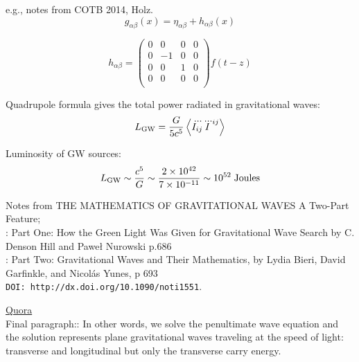 \documentclass[11pt,a4paper]{article}
\begin{document}
\smallskip
\smallskip
e.g., notes from COTB 2014, Holz. \\

\begin{equation}
  g_{\alpha \beta}(x) = \eta_{\alpha \beta} + h_{\alpha \beta}(x)
\end{equation}

\begin{equation}
h_{\alpha \beta} = \begin{pmatrix}
                                0  &    0  & 0  & 0  \\ 
                                0  &  -1   & 0  & 0   \\ 
                                0  &    0  & 1  & 0  \\ 
                                0  &    0   & 0  & 0   \\ 
                         \end{pmatrix}
f(t-z)
\end{equation}

\noindent
Quadrupole formula gives the total power radiated in gravitational waves:
\begin{equation}
L_{\rm GW}  =  \frac{G}{5c^5} \left \langle  \dddot{I_{ij}} \dddot{I}^{ij} \right \rangle 
\end{equation}

\noindent
Luminosity of GW sources:
\begin{equation}
 L_{\rm GW} \sim \frac{c^5}{G} \sim \frac{2\times 10^{42}} {7\times 10^{-11}} \sim 10^{52} \;  {\rm Joules}
\end{equation}

\smallskip
\smallskip

Notes from THE MATHEMATICS OF GRAVITATIONAL WAVES
A Two-Part Feature;\\ 
\rbrack: Part One: How the Green Light Was Given for Gravitational Wave Search by C. Denson Hill and Paweł Nurowski p.686 \\  
\rbrack: Part Two: Gravitational Waves and Their Mathematics, by Lydia Bieri, David Garfinkle, and Nicolás Yunes, p 693 \\
{\tt DOI: http://dx.doi.org/10.1090/noti1551}. 



\href{https://www.quora.com/What-is-the-wave-equation-of-gravitational-waves}{Quora}\\
Final paragraph:: 
In other words, we solve the penultimate wave equation and the
solution represents plane gravitational waves traveling at the speed
of light: transverse and longitudinal but only the transverse carry
energy.
\end{document}
